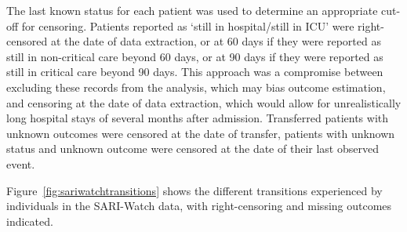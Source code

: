 The last known status for each patient was used to determine an appropriate cut-off for censoring. Patients reported as `still in hospital/still in ICU' were right-censored at the date of data extraction, or at 60 days if they were reported as still in non-critical care beyond 60 days, or at 90 days if they were reported as still in critical care beyond 90 days. This approach was a compromise between excluding these records from the analysis, which may bias outcome estimation, and censoring at the date of data extraction, which would allow for unrealistically long hospital stays of several months after admission. Transferred patients with unknown outcomes were censored at the date of transfer, patients with unknown status and unknown outcome were censored at the date of their last observed event.

Figure~\ref{fig:sariwatchtransitions} shows the different transitions experienced by individuals in the SARI-Watch data, with right-censoring and missing outcomes indicated.


